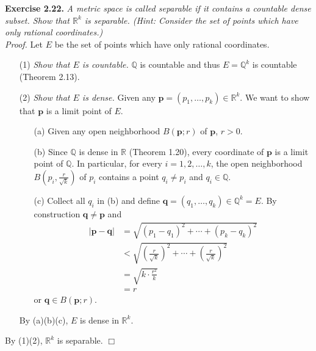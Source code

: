 \documentclass{article}
\begin{document}



\textbf{Exercise 2.22.}
\emph{A metric space is called separable if it contains a countable dense subset.
Show that $\mathbb{R}^k$ is separable.
(Hint: Consider the set of points which have only rational coordinates.)} \\

\emph{Proof.}
Let $E$ be the set of points which have only rational coordinates.
\begin{enumerate}
\item[(1)]
\emph{Show that $E$ is countable.} $\mathbb{Q}$ is countable
and thus $E = \mathbb{Q}^k$ is countable (Theorem 2.13).
\item[(2)]
\emph{Show that $E$ is dense.}
Given any $\mathbf{p} = (p_1, \ldots, p_k) \in \mathbb{R}^k$.
We want to show that $\mathbf{p}$ is a limit point of $E$.
  \begin{enumerate}
  \item[(a)]
  Given any open neighborhood $B(\mathbf{p};r)$ of $\mathbf{p}$, $r > 0$.
  \item[(b)]
  Since $\mathbb{Q}$ is dense in $\mathbb{R}$ (Theorem 1.20),
  every coordinate of $\mathbf{p}$ is a limit point of $\mathbb{Q}$.
  In particular, for every $i = 1, 2, \ldots, k$,
  the open neighborhood $B\left(p_i, \frac{r}{\sqrt{k}}\right)$ of $p_i$
  contains a point $q_i \neq p_i$ and $q_i \in \mathbb{Q}$.
  \item[(c)]
  Collect all $q_i$ in (b)
  and define $\mathbf{q} = (q_1, \ldots, q_k) \in \mathbb{Q}^k = E$.
  By construction $\mathbf{q} \neq \mathbf{p}$ and
  \begin{align*}
    |\mathbf{p} - \mathbf{q}|
    &= \sqrt{(p_1 - q_1)^2 + \cdots + (p_k - q_k)^2} \\
    &< \sqrt{\left(\frac{r}{\sqrt{k}}\right)^2 + \cdots
      + \left(\frac{r}{\sqrt{k}}\right)^2} \\
    &= \sqrt{k \cdot \frac{r^2}{k}} \\
    &= r
  \end{align*}
  or $\mathbf{q} \in B(\mathbf{p};r)$.
  \end{enumerate}
  By (a)(b)(c), $E$ is dense in $\mathbb{R}^k$.
\end{enumerate}
By (1)(2), $\mathbb{R}^k$ is separable.
$\Box$ \\\\
\end{document}
